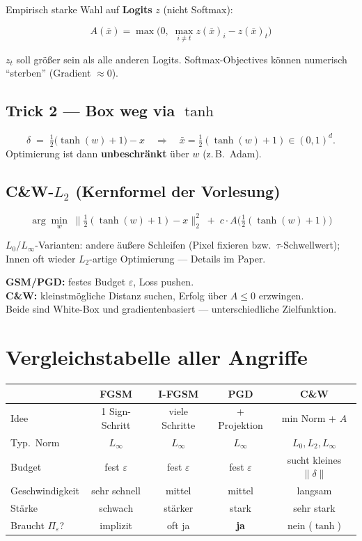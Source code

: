 \documentclass[11pt,a4paper]{article}
\newcommand{\eps}{\varepsilon}
\begin{document}
Empirisch starke Wahl auf \textbf{Logits} $z$ (nicht Softmax):
\begin{formulabox}
\[
A(\bar x)
=
\max\Big(0,\;
\max_{i\neq t} z(\bar x)_i - z(\bar x)_t
\Big)
\]
\end{formulabox}
$z_t$ soll größer sein als alle anderen Logits. Softmax-Objectives können
numerisch ``sterben'' (Gradient $\approx 0$).

\subsection{Trick 2 --- Box weg via $\tanh$}
\[
\delta \;=\; \tfrac12\big(\tanh(w)+1\big) - x
\quad\Rightarrow\quad
\bar x=\tfrac12(\tanh(w)+1)\in(0,1)^d.
\]
Optimierung ist dann \textbf{unbeschränkt} über $w$ (z.\,B.\ Adam).

\subsection{C\&W-$L_2$ (Kernformel der Vorlesung)}
\begin{formulabox}
\[
\arg\min_w\;
\Big\|
\tfrac12(\tanh(w)+1)-x
\Big\|_2^{\!2}
\;+\;
c\cdot A\!\Big(\tfrac12(\tanh(w)+1)\Big)
\]
\end{formulabox}
$L_0$/$L_\infty$-Varianten: andere äußere Schleifen (Pixel fixieren bzw.\ $\tau$-Schwellwert);
Innen oft wieder $L_2$-artige Optimierung --- Details im Paper.

\begin{linkbox}[GSM vs.\ C\&W]
\textbf{GSM/PGD:} festes Budget $\eps$, Loss pushen.\\
\textbf{C\&W:} kleinstmögliche Distanz suchen, Erfolg über $A\le 0$ erzwingen.\\
Beide sind White-Box und gradientenbasiert --- unterschiedliche Zielfunktion.
\end{linkbox}

\section{Vergleichstabelle aller Angriffe}

\begin{center}
\renewcommand{\arraystretch}{1.22}
\footnotesize
\begin{tabular}{@{}lcccc@{}}
\toprule
& \textbf{FGSM} & \textbf{I-FGSM} & \textbf{PGD} & \textbf{C\&W} \\
\midrule
Idee & 1 Sign-Schritt & viele Schritte & + Projektion & min Norm + $A$ \\
Typ.\ Norm & $L_\infty$ & $L_\infty$ & $L_\infty$ & $L_0,L_2,L_\infty$ \\
Budget & fest $\eps$ & fest $\eps$ & fest $\eps$ & sucht kleines $\|\delta\|$ \\
Geschwindigkeit & sehr schnell & mittel & mittel & langsam \\
Stärke & schwach & stärker & stark & sehr stark \\
Braucht $\Pi_\eps$? & implizit & oft ja & \textbf{ja} & nein ($\tanh$) \\
\bottomrule
\end{tabular}
\end{center}
\end{document}

